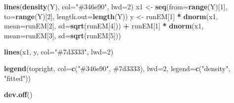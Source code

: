 \documentclass[
]{article}
\newenvironment{Shaded}{\begin{snugshade}}{\end{snugshade}}
\newcommand{\AttributeTok}[1]{\textcolor[rgb]{0.13,0.29,0.53}{#1}}
\newcommand{\DecValTok}[1]{\textcolor[rgb]{0.00,0.00,0.81}{#1}}
\newcommand{\FunctionTok}[1]{\textcolor[rgb]{0.13,0.29,0.53}{\textbf{#1}}}
\newcommand{\NormalTok}[1]{#1}
\newcommand{\OtherTok}[1]{\textcolor[rgb]{0.56,0.35,0.01}{#1}}
\newcommand{\SpecialCharTok}[1]{\textcolor[rgb]{0.81,0.36,0.00}{\textbf{#1}}}
\newcommand{\StringTok}[1]{\textcolor[rgb]{0.31,0.60,0.02}{#1}}
\begin{document}
\begin{Shaded}
\begin{Highlighting}[]
\FunctionTok{lines}\NormalTok{(}\FunctionTok{density}\NormalTok{(Y), }\AttributeTok{col=}\StringTok{"\#346e90"}\NormalTok{, }\AttributeTok{lwd=}\DecValTok{2}\NormalTok{)}
\NormalTok{x1 }\OtherTok{\textless{}{-}} \FunctionTok{seq}\NormalTok{(}\AttributeTok{from=}\FunctionTok{range}\NormalTok{(Y)[}\DecValTok{1}\NormalTok{], }\AttributeTok{to=}\FunctionTok{range}\NormalTok{(Y)[}\DecValTok{2}\NormalTok{], }\AttributeTok{length.out=}\FunctionTok{length}\NormalTok{(Y))}
\NormalTok{y }\OtherTok{\textless{}{-}}\NormalTok{ runEM[}\DecValTok{1}\NormalTok{] }\SpecialCharTok{*} \FunctionTok{dnorm}\NormalTok{(x1, }\AttributeTok{mean=}\NormalTok{runEM[}\DecValTok{2}\NormalTok{], }\AttributeTok{sd=}\FunctionTok{sqrt}\NormalTok{(runEM[}\DecValTok{4}\NormalTok{])) }\SpecialCharTok{+}\NormalTok{ runEM[}\DecValTok{1}\NormalTok{] }\SpecialCharTok{*} \FunctionTok{dnorm}\NormalTok{(x1, }\\ 
\AttributeTok{mean=}\NormalTok{runEM[}\DecValTok{3}\NormalTok{], }\AttributeTok{sd=}\FunctionTok{sqrt}\NormalTok{(runEM[}\DecValTok{5}\NormalTok{]))}

\FunctionTok{lines}\NormalTok{(x1, y, }\AttributeTok{col=}\StringTok{"\#7d3333"}\NormalTok{, }\AttributeTok{lwd=}\DecValTok{2}\NormalTok{)}

\FunctionTok{legend}\NormalTok{(}\StringTok{\textquotesingle{}topright\textquotesingle{}}\NormalTok{, }\AttributeTok{col=}\FunctionTok{c}\NormalTok{(}\StringTok{"\#346e90"}\NormalTok{, }\StringTok{\textquotesingle{}\#7d3333\textquotesingle{}}\NormalTok{), }\AttributeTok{lwd=}\DecValTok{2}\NormalTok{, }\AttributeTok{legend=}\FunctionTok{c}\NormalTok{(}\StringTok{"density"}\NormalTok{, }\StringTok{"fitted"}\NormalTok{))}

\FunctionTok{dev.off}\NormalTok{()}
\end{Highlighting}
\end{Shaded}
\end{document}
